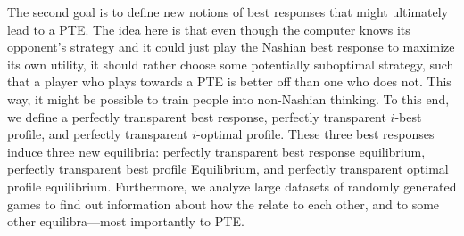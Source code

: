 The second goal is to define new notions of best responses that might ultimately lead to a PTE.
The idea here is that even though the computer knows its opponent's strategy and it could just play the Nashian best response to maximize its own utility, it should rather choose some potentially suboptimal strategy, such that a player who plays towards a PTE is better off than one who does not.
This way, it might be possible to train people into non-Nashian thinking.
To this end, we define a perfectly transparent best response, perfectly transparent $i$-best profile, and perfectly transparent $i$-optimal profile.
These three best responses induce three new equilibria: perfectly transparent best response equilibrium, perfectly transparent best profile Equilibrium, and perfectly transparent optimal profile equilibrium.
Furthermore, we analyze large datasets of randomly generated games to find out information about how the relate to each other, and to some other equilibra---most importantly to PTE.
